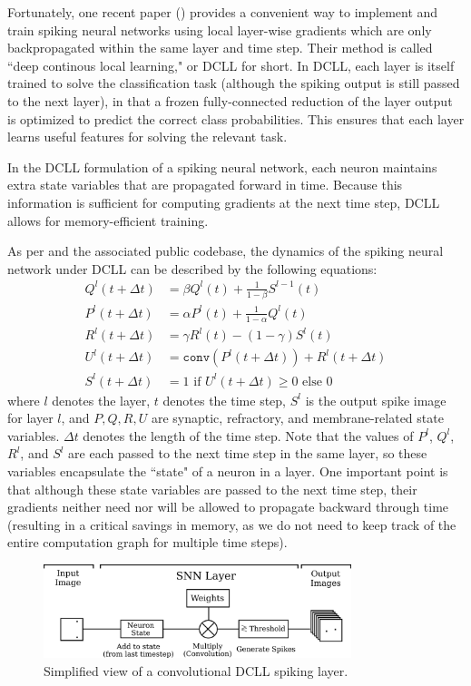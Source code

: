 \documentclass[parskip=true, 10pt]{scrartcl}
\begin{document}
Fortunately, one recent paper (\cite{DBLP:journals/corr/abs-1811-10766}) provides a convenient way to implement and train spiking neural networks using local layer-wise gradients which are only backpropagated within the same layer and time step. Their method is called ``deep continous local learning," or DCLL for short. In DCLL, each layer is itself trained to solve the classification task (although the spiking output is still passed to the next layer), in that a frozen fully-connected reduction of the layer output is optimized to predict the correct class probabilities. This ensures that each layer learns useful features for solving the relevant task.

In the DCLL formulation of a spiking neural network, each neuron maintains extra state variables that are propagated forward in time. Because this information is sufficient for computing gradients at the next time step, DCLL allows for memory-efficient training.

As per \cite{DBLP:journals/corr/abs-1811-10766} and the associated public codebase, the dynamics of the spiking neural network under DCLL can be described by the following equations:
\begin{align*}
    Q^l(t + \Delta t) &= \beta Q^l(t) + \frac{1}{1 - \beta}S^{l-1}(t) \\
    P^l(t + \Delta t) &= \alpha P^l(t) + \frac{1}{1 - \alpha}Q^l(t) \\
    R^l(t + \Delta t) &= \gamma R^l(t) - (1 - \gamma) S^l(t) \\
    U^l(t + \Delta t) &= \texttt{conv}(P^l(t + \Delta t)) + R^l(t + \Delta t) \\
    S^l(t + \Delta t) &= 1 \text{ if } U^l(t + \Delta t) \geq 0 \text{ else } 0
\end{align*}
where $l$ denotes the layer, $t$ denotes the time step, $S^l$ is the output spike image for layer $l$, and $P, Q, R, U$ are synaptic, refractory, and membrane-related state variables. $\Delta t$ denotes the length of the time step. Note that the values of $P^l$, $Q^l$, $R^l$, and $S^l$ are each passed to the next time step in the same layer, so these variables encapsulate the ``state" of a neuron in a layer. One important point is that although these state variables are passed to the next time step, their gradients neither need nor will be allowed to propagate backward through time (resulting in a critical savings in memory, as we do not need to keep track of the entire computation graph for multiple time steps).

\begin{figure}[h]
    \centering
    \includegraphics[width=0.8\textwidth]{spiking-layers.png}
    \caption{Simplified view of a convolutional DCLL spiking layer.}
    \label{fig:snn_neuron}
\end{figure}
\end{document}
